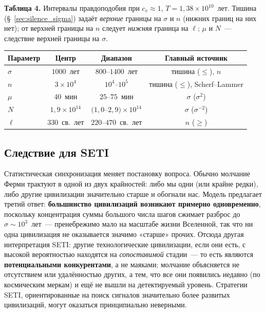 \documentclass[12pt,a4paper]{article}
\begin{document}
\begin{center}
\textbf{Таблица 4.} Интервалы правдоподобия при $c_v\approx1$, $T=1{,}38\times10^{10}$~лет. Тишина (\S~\ref{sec:silence_sigma}) задаёт \emph{верхние} границы на $\sigma$ и $n$ (нижних границ на них нет); от верхней границы на $n$ следует \emph{нижняя} граница на $\ell$; $\mu$ и $N$~--- следствие верхней границы на $\sigma$.

\medskip
\small
\begin{tabular}{l c c c}
\hline
Параметр & Центр & Диапазон & Главный источник \\
\hline
$\sigma$ & $1000$~лет & $800$--$1400$~лет & тишина ($\le$), $n$ \\
$n$ & $3\times10^4$ & $10^4$--$10^5$ & тишина ($\le$), Scherf--Lammer \\
$\mu$ & $40$~мин & $25$--$75$~мин & $\sigma$ ($\sigma^2$) \\
$N$ & $1{,}9\times10^{14}$ & $(1{,}0$--$2{,}9)\times10^{14}$ & $\sigma$ ($\sigma^{-2}$) \\
$\ell$ & $330$~св.~лет & $220$--$470$~св.~лет & $n$ ($\ge$) \\
\hline
\end{tabular}
\normalsize
\end{center}

\subsection{Следствие для SETI}
\label{sec:seti}

Статистическая синхронизация меняет постановку вопроса. Обычно молчание Ферми трактуют в одной из двух крайностей: либо мы одни (или крайне редки), либо другие цивилизации значительно старше и обогнали нас. Модель предлагает третий ответ: \textbf{большинство цивилизаций возникают примерно одновременно}, поскольку концентрация суммы большого числа шагов сжимает разброс до $\sigma \sim 10^3$~лет~--- пренебрежимо мало на масштабе жизни Вселенной, так что ни одна цивилизация не оказывается значимо «старше» прочих. Отсюда другая интерпретация SETI: другие технологические цивилизации, если они есть, с высокой вероятностью находятся на \emph{сопоставимой} стадии~--- то есть являются \textbf{потенциальными конкурентами}, а не маяками; молчание объясняется не отсутствием или удалённостью других, а тем, что все они появились недавно (по космическим меркам) и ещё не вышли на детектируемый уровень. Стратегии SETI, ориентированные на поиск сигналов значительно более развитых цивилизаций, могут оказаться принципиально неверными.
\end{document}
